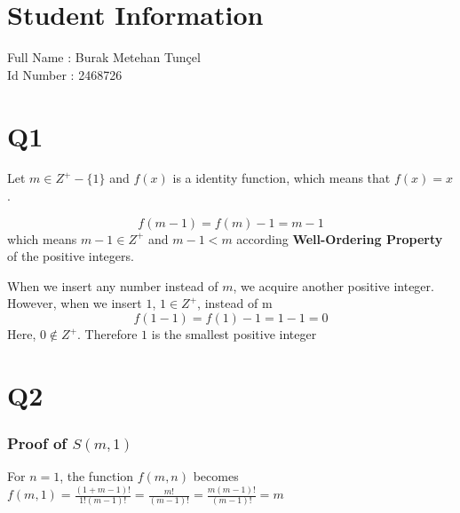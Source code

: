 \documentclass[11pt]{article}
\begin{document}
\section*{Student Information } 
Full Name :  Burak Metehan Tunçel \\
Id Number :  2468726 \\


\section*{Q1}
Let $m \in Z^+-\{1\}$ and $f(x)$ is a identity function, which means that $f(x) = x$.

\begin{equation*}
    f(m-1) = f(m) - 1 = m - 1
\end{equation*}
which means $m - 1 \in Z^+$ and $m - 1 < m$ according \textbf{Well-Ordering Property} of the positive integers.

When we insert any number instead of $m$, we acquire another positive integer. However, when we insert $1$, $1 \in Z^+$, instead of m
\begin{equation*}
    f(1 - 1) = f(1) - 1 = 1 - 1 = 0
\end{equation*}
Here, $0 \notin Z^+$. Therefore $1$ is the smallest positive integer


\section*{Q2}
\subsubsection*{Proof of $S(m, 1)$}

For $n = 1$, the function $f(m, n)$ becomes $f(m, 1) = \frac{(1 + m - 1)!}{1! (m-1)!} = \frac{m!}{(m-1)!} = \frac{m (m-1)!}{(m-1)!} = m$
\end{document}

